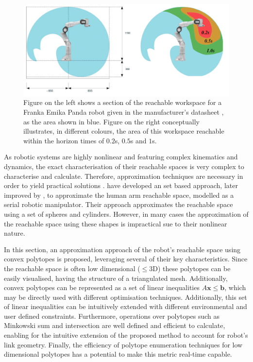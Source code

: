 \begin{figure}
    \centering
    \includegraphics[width=0.8\linewidth]{Papers/images/all_rs_thesis.png}
    \caption{Figure on the left shows a section of the reachable workspace for a Franka Emika Panda robot given in the manufacturer's datasheet \cite{franka_maual}, as the area shown in blue. Figure on the right conceptually illustrates, in different colours, the area of this workspace reachable within the horizon times of $0.2$s, $0.5$s and $1$s.}
    \label{fig:franak_reachable_worksapce}
\end{figure}

As robotic systems are highly nonlinear and featuring complex kinematics and dynamics, the exact characterisation of their reachable spaces is very complex to characterise and calculate. Therefore, approximation techniques are necessary in order to yield practical solutions \cite{Althoff2021SetBased}. \citet{pereira2017} have developed an set based approach, later improved by \citet{schepp2022}, to approximate the human arm reachable space, modelled as a serial robotic manipulator. Their approach approximates the reachable space using a set of spheres and cylinders. However, in many cases the approximation of the reachable space using these shapes is impractical sue to their nonlinear nature. 

In this section, an approximation approach of the robot's reachable space using convex polytopes is proposed, leveraging several of their key characteristics. Since the reachable space is often low dimensional ($\leq$3D) these polytopes can be easily visualised, having the structure of a triangulated mesh. Additionally, convex polytopes can be represented as a set of linear inequalities $A\bm{x}\leq\bm{b}$, which may be directly used with different optimisation techniques. Additionally, this set of linear inequalities can be intuitively extended with different environmental and user defined constraints. Furthermore, operations over polytopes such as Minkowski sum and intersection are well defined and efficient to calculate, enabling for the intuitive extension of the proposed method to account for robot's link geometry. Finally, the efficiency of polytope enumeration techniques for low dimensional polytopes has a potential to make this metric real-time capable. 

